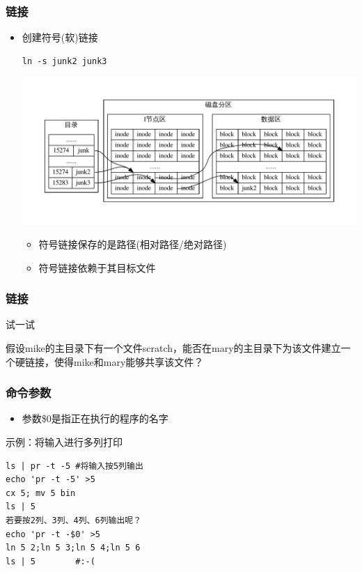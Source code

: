 \documentclass[xcolor=svgnames,presentation]{beamer}
\begin{document}
\begin{frame}[fragile]
\frametitle{链接}
\label{sec-1-1-7}
\begin{itemize}

\item 创建符号(软)链接\\
\label{sec-1-1-7-1}%
\begin{verbatim}
ln -s junk2 junk3
\end{verbatim}
\includegraphics[width=.9\linewidth]{img/inode4.pdf}
\begin{itemize}

\item 符号链接保存的是路径(相对路径/绝对路径)
\label{sec-1-1-7-1-1}%

\item 符号链接依赖于其目标文件
\label{sec-1-1-7-1-2}%
\end{itemize} %
\end{itemize} %
\end{frame}
\begin{frame}
\frametitle{链接}
\label{sec-1-1-8}
\begin{block}{试一试}
\label{sec-1-1-8-1}

假设mike的主目录下有一个文件scratch，能否在mary的主目录下为该文件建立一个硬链接，使得mike和mary能够共享该文件？
\end{block}
\end{frame}
\begin{frame}[fragile]
\frametitle{命令参数}
\label{sec-1-1-9}
\begin{itemize}

\item 参数\$0是指正在执行的程序的名字
\label{sec-1-1-9-1}%
\end{itemize} %
\begin{exampleblock}{示例：将输入进行多列打印}
\label{sec-1-1-9-2}


\begin{verbatim}
ls | pr -t -5 #将输入按5列输出
echo 'pr -t -5' >5
cx 5; mv 5 bin
ls | 5
若要按2列、3列、4列、6列输出呢？
echo 'pr -t -$0' >5
ln 5 2;ln 5 3;ln 5 4;ln 5 6
ls | 5        #:-(
\end{verbatim}
\end{exampleblock}
\end{frame}
\end{document}
